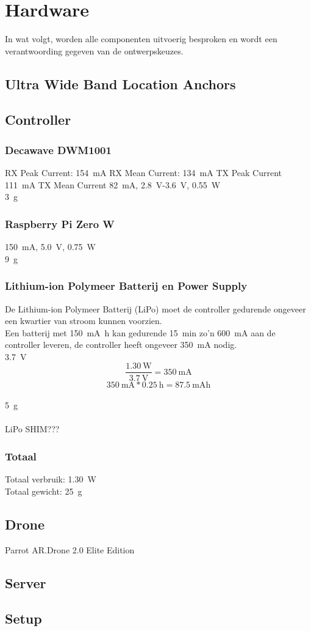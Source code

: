 \chapter{Hardware}
In wat volgt, worden alle componenten uitvoerig besproken en wordt een verantwoording gegeven van de ontwerpskeuzes.

\section{Ultra Wide Band Location Anchors}  \label{sec:uwb_location_anchors}


\section{Controller} \label{sec:controller}
\subsection{Decawave DWM1001}  \label{sec:decawave}
RX Peak Current: \SI{154}{\mA} RX Mean Current: \SI{134}{\mA} TX Peak Current \SI{111}{\mA} TX Mean Current \SI{82}{mA}, \SI{2.8}{\V}-\SI{3.6}{\V}, \SI{0.55}{\W}\\
\SI{3}{\g}

\subsection{Raspberry Pi Zero W} \label{sec:raspberry_pi}
\SI{150}{\mA}, \SI{5.0}{\V}, \SI{0.75}{\W}\\
\SI{9}{\g}

\subsection{Lithium-ion Polymeer Batterij en Power Supply} \label{sec:lipo}
De Lithium-ion Polymeer Batterij (LiPo) moet de controller gedurende ongeveer een kwartier van stroom kunnen voorzien.\\
Een batterij met \SI{150}{\mA\hour} kan gedurende \SI{15}{\minute} zo'n \SI{600}{\mA} aan de controller leveren, de controller heeft ongeveer \SI{350}{\mA} nodig.\\
\SI{3.7}{\V}
\[\frac{\SI{1.30}{\W}}{\SI{3.7}{\V}}=\SI{350}{\mA}\]
\[\SI{350}{\mA}*\SI{0.25}{\hour}=\SI{87.5}{\mA\hour}\]\\
\SI{5}{\g}\\
\\
LiPo SHIM???

\subsection{Totaal} \label{sec:totaal}
Totaal verbruik: \SI{1.30}{\W}\\
Totaal gewicht: \SI{25}{\g}

\section{Drone} \label{sec:drone}
Parrot AR.Drone 2.0 Elite Edition

\section{Server} \label{sec:server}


\section{Setup} \label{sec:setup}
